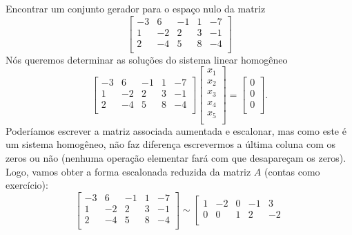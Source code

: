 \begin{ex}
	Encontrar um conjunto gerador para o espaço nulo da matriz
	\begin{equation}
	\left[
	\begin{array}{ccccc}
	-3 & 6  & -1 & 1 & -7 \\
	1  & -2 & 2  & 3 & -1 \\
	2  & -4 & 5  & 8 & -4 \\
	\end{array}
	\right]
	\end{equation} Nós queremos determinar as soluções do sistema linear homogêneo
	\begin{equation}
	\left[
	\begin{array}{ccccc}
	-3 & 6  & -1 & 1 & -7 \\
	1  & -2 & 2  & 3 & -1 \\
	2  & -4 & 5  & 8 & -4 \\
	\end{array}
	\right]
	\left[
	\begin{array}{c}
	x_1 \\
	x_2 \\
	x_3 \\
	x_4 \\
	x_5 \\
	\end{array}
	\right] =
	\left[
	\begin{array}{c}
	0 \\
	0 \\
	0 \\
	\end{array}
	\right].
	\end{equation} Poderíamos escrever a matriz associada aumentada e escalonar, mas como este é um sistema homogêneo, não faz diferença escrevermos a última coluna com os zeros ou não (nenhuma operação elementar fará com que desapareçam os zeros). Logo, vamos obter a forma escalonada reduzida da matriz $A$ (contas como exercício):
	\begin{equation}
	\left[
	\begin{array}{ccccc}
	-3 & 6  & -1 & 1 & -7 \\
	1  & -2 & 2  & 3 & -1 \\
	2  & -4 & 5  & 8 & -4 \\
	\end{array}
	\right] \sim
	\left[
	\begin{array}{ccccc}
	1 & -2 & 0  & -1 & 3  \\
	0 & 0  & 1  & 2  & -2 \\

\end{array}
\end{equation}
\end{ex}
